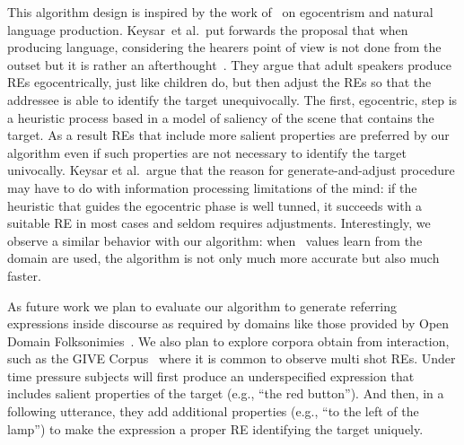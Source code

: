 This algorithm design is inspired by the work of~\cite{keysar:Curr98} on egocentrism and natural language production. Keysar~et al.\ put forwards the proposal that when producing language, considering the hearers point of view is not done from the outset but it is rather an afterthought~\cite{keysar:Curr98}. They argue that adult speakers produce REs egocentrically, just like children do, but then adjust the REs so that the addressee is able to identify the target unequivocally. The first, egocentric, step is a heuristic process based in a model of saliency of the scene that contains the target. As a result REs that include more salient properties are preferred by our algorithm even if such properties are not necessary to identify the target univocally. Keysar et al.~argue that the reason for generate-and-adjust procedure may have to do with information processing limitations of the mind: if the heuristic that guides the egocentric phase is well tunned, it succeeds with a suitable RE in most cases and seldom requires adjustments. Interestingly, we observe a similar behavior with our algorithm: when \puse\ values learn from the domain are used, the algorithm is not only much more accurate but also much faster. 

As future work we plan to evaluate our algorithm to generate referring expressions inside discourse as required by domains like those provided by Open Domain Folksonimies~\cite{pacheco-duboue-dominguez:2012:NAACL-HLT}. We also plan to explore corpora obtain from interaction, such as the GIVE Corpus~\cite{GarGarKolStr10} where it is common to observe multi shot REs. Under time pressure subjects will first produce an underspecified expression that includes salient properties of the target (e.g., ``the red button'').  And then, in a following utterance, they add additional properties (e.g., ``to the left of the lamp'') to make the expression a proper RE  identifying the target uniquely.

